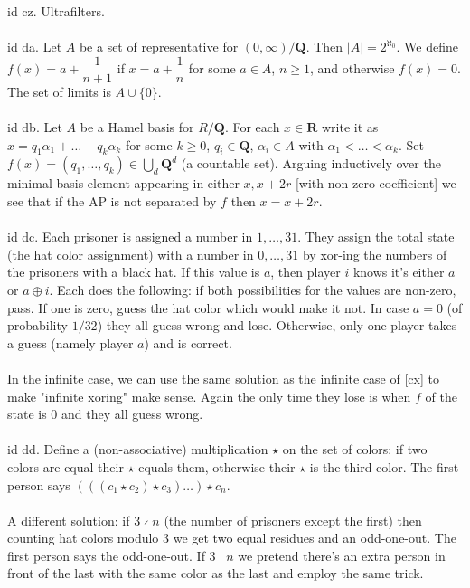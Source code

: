 \documentclass[oneside]{book}
\newcommand{\R}{\mathbf{R}}
\newcommand{\Q}{\mathbf{Q}}
\newcommand{\set}[1]{\{ #1\}}
\newcommand{\abs}[1]{\left\lvert #1\right\rvert}
\begin{document}
id cz. Ultrafilters.\\\\


id da. Let $A$ be a set of representative for $(0,\infty)/\Q$. Then $\abs{A}=2^{\aleph_0}$. We define $f(x)=a+\dfrac{1}{n+1}$ if $x=a+\dfrac{1}{n}$ for some $a\in A$, $n\ge 1$, and otherwise $f(x)=0$. The set of limits is $A\cup\set{0}$.\\\\


id db. Let $A$ be a Hamel basis for $R/\Q$. For each $x\in \R$ write it as $x=q_1\alpha_1+\dots+q_k\alpha_k$ for some $k\ge 0$, $q_i\in\Q$, $\alpha_i\in A$ with $\alpha_1<\dots<\alpha_k$. Set $f(x)=(q_1,\dots,q_k)\in \bigcup_d \Q^d$ (a countable set). Arguing inductively over the minimal basis element appearing in either $x,x+2r$ [with non-zero coefficient] we see that if the AP is not separated by $f$ then $x=x+2r$.\\\\


id dc. Each prisoner is assigned a number in $1,\dots,31$. They assign the total state (the hat color assignment) with a number in $0,\dots,31$ by xor-ing the numbers of the prisoners with a black hat. If this value is $a$, then player $i$ knows it's either $a$ or $a\oplus i$. Each does the following: if both possibilities for the values are non-zero, pass. If one is zero, guess the hat color which would make it not. In case $a=0$ (of probability $1/32$) they all guess wrong and lose. Otherwise, only one player takes a guess (namely player $a$) and is correct.\\\\
In the infinite case, we can use the same solution as the infinite case of [cx] to make "infinite xoring" make sense. Again the only time they lose is when $f$ of the state is $0$ and they all guess wrong.\\\\


id dd. Define a (non-associative) multiplication $\star$ on the set of colors: if two colors are equal their $\star$ equals them, otherwise their $\star$ is the third color. The first person says $(((c_1\star c_2)\star c_3)\dots)\star c_n$.\\\\
A different solution: if $3\nmid n$ (the number of prisoners except the first) then counting hat colors modulo $3$ we get two equal residues and an odd-one-out. The first person says the odd-one-out. If $3\mid n$ we pretend there's an extra person in front of the last with the same color as the last and employ the same trick.\\\\ 
\end{document}
